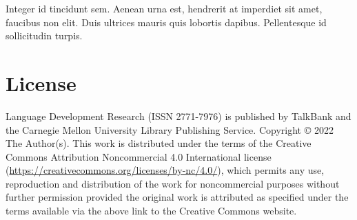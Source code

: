 \documentclass{ldr-article}
\begin{document}
Integer id tincidunt sem. Aenean urna est, hendrerit at imperdiet sit amet, faucibus non elit. Duis ultrices mauris quis lobortis dapibus. Pellentesque id sollicitudin turpis.



\section{License}
Language Development Research (ISSN 2771-7976) is published by TalkBank and the Carnegie Mellon University Library Publishing Service. Copyright © 2022 The Author(s). This work is distributed under the terms of the Creative Commons Attribution Noncommercial 4.0 International license (\url{https://creativecommons.org/licenses/by-nc/4.0/}), which permits any use, reproduction and distribution of the work for noncommercial purposes without further permission provided the original work is attributed as specified under the terms available via the above link to the Creative Commons website.

 
\end{document}
